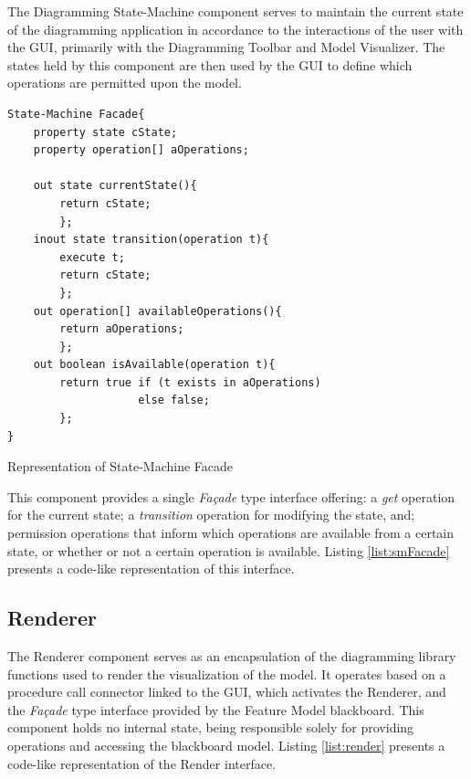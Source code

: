 The Diagramming State-Machine component serves to maintain the current state of the diagramming application in accordance to the interactions of the user with the GUI, primarily with the Diagramming Toolbar and Model Visualizer. The states held by this component are then used by the GUI to define which operations are permitted upon the model.

\begin{listing}
\begin{verbatim} 
State-Machine Facade{
    property state cState;
    property operation[] aOperations;

    out state currentState(){ 
        return cState; 
        };
    inout state transition(operation t){
        execute t;
        return cState;
        };
    out operation[] availableOperations(){
        return aOperations;
        };
    out boolean isAvailable(operation t){
        return true if (t exists in aOperations)
                    else false;
        };
}
\end{verbatim}
\caption{Representation of State-Machine Facade}
\label{list:smFacade}
\end{listing}

This component provides a single \textit{Façade} type interface offering: a \textit{get} operation for the current state; a \textit{transition} operation for modifying the state, and; permission operations that inform which operations are available from a certain state, or whether or not a certain operation is available. Listing \ref{list:smFacade} presents a code-like representation of this interface.


\subsection{Renderer}

The Renderer component serves as an encapsulation of the diagramming library functions used to render the visualization of the model. It operates based on a procedure call connector linked to the GUI, which activates the Renderer, and the \textit{Façade} type interface provided by the Feature Model blackboard. This component holds no internal state, being responsible solely for providing operations and accessing the blackboard model. Listing \ref{list:render} presents a code-like representation of the Render interface.

